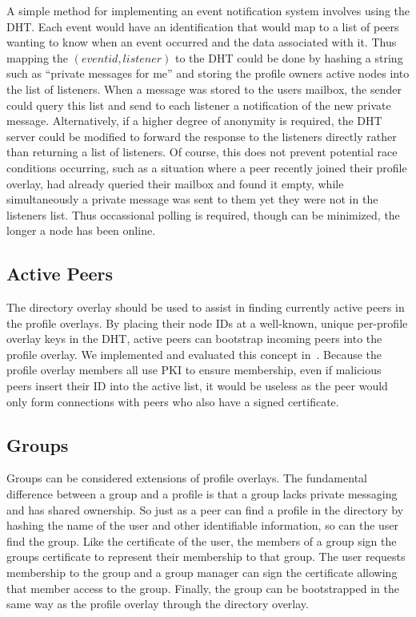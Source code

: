 \documentclass[conference]{IEEEtran}
\begin{document}
A simple method for implementing an event notification system involves using
the DHT.  Each event would have an identification that would map to a list of
peers wanting to know when an event occurred and the data associated with it.
Thus mapping the $(event id, listener)$ to the DHT could be done by hashing a
string such as ``private messages for me'' and storing the profile owners
active nodes into the list of listeners.  When a message was stored to the
users mailbox, the sender could query this list and send to each listener a
notification of the new private message.  Alternatively, if a higher degree of
anonymity is required, the DHT server could be modified to forward the
response to the listeners directly rather than returning a list of listeners.
Of course, this does not prevent potential race conditions occurring, such as
a situation where a peer recently joined their profile overlay, had already
queried their mailbox and found it empty, while simultaneously a private
message was sent to them yet they were not in the listeners list.  Thus
occassional polling is required, though can be minimized, the longer a node
has been online.

\subsection{Active Peers}

The directory overlay should be used to assist in finding currently active
peers in the profile overlays.  By placing their node IDs at a well-known,
unique per-profile overlay keys in the DHT, active peers can bootstrap
incoming peers into the profile overlay.  We implemented and evaluated this
concept in~\cite{vpo}.  Because the profile overlay members all use PKI to
ensure membership, even if malicious peers insert their ID into the active
list, it would be useless as the peer would only form connections with peers
who also have a signed certificate.

\subsection{Groups}

Groups can be considered extensions of profile overlays.  The fundamental
difference between a group and a profile is that a group lacks private
messaging and has shared ownership.  So just as a peer can find a profile in
the directory by hashing the name of the user and other identifiable
information, so can the user find the group.  Like the certificate of the
user, the members of a group sign the groups certificate to represent their
membership to that group.  The user requests membership to the group and a
group manager can sign the certificate allowing that member access to the
group.  Finally, the group can be bootstrapped in the same way as the profile
overlay through the directory overlay.
\end{document}
